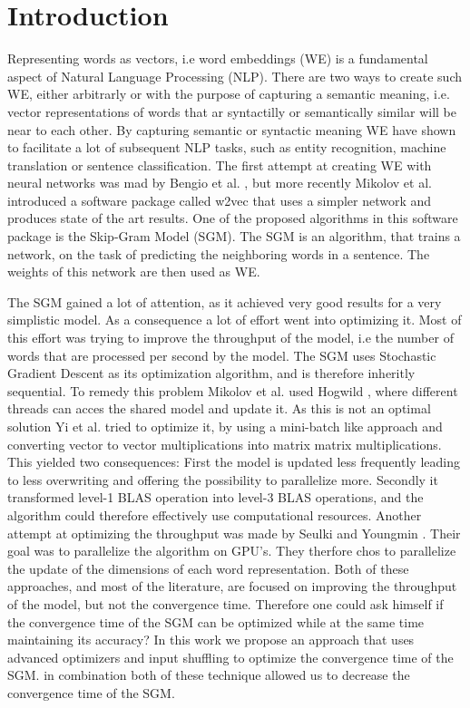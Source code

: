 \chapter{Introduction}\label{chap:introduction}

Representing words as vectors, i.e word embeddings (WE) is a fundamental aspect of Natural Language Processing (NLP). There are two ways to create such WE, either arbitrarly or with the purpose of capturing a semantic meaning, i.e. vector representations of words that ar syntactilly or semantically similar will be near to each other. By capturing semantic or syntactic meaning WE have shown to facilitate a lot of subsequent NLP tasks, such as entity recognition, machine translation or sentence classification.  The first attempt at creating WE with neural networks was mad by Bengio et al. \cite{bengio}, but more recently Mikolov et al. \cite{mikolov} introduced a software package called w2vec that uses a simpler network and produces state of the art results. One of the proposed algorithms in this software package is the Skip-Gram Model (SGM). The SGM is an algorithm, that trains a network, on the task of predicting the neighboring words in a sentence. The weights of this network are then used as WE. 

The SGM gained a lot of attention, as it achieved very good results for a very simplistic model. As a consequence a lot of effort went into optimizing  it. Most of this effort was trying to improve the throughput of the model, i.e the number of words that are processed per second by the model. The SGM uses Stochastic Gradient Descent as its optimization algorithm, and is therefore inheritly sequential. To remedy this problem Mikolov et al. used Hogwild \cite{hogwild}, where different threads can acces the shared model and update it. As this is not an optimal solution Yi et al. \cite{intel} tried to optimize it, by using a mini-batch like approach and converting vector to vector multiplications into matrix matrix multiplications. This yielded two consequences: First the model is updated less frequently leading to less overwriting and offering the possibility to parallelize more. Secondly it transformed level-1 BLAS operation into level-3 BLAS operations, and the algorithm could therefore effectively use computational resources. Another attempt at optimizing the throughput was made by Seulki and Youngmin \cite{gpu}. Their goal was to parallelize the algorithm on GPU's. They therfore chos to parallelize the update of the dimensions of each word representation. Both of these approaches, and most of the literature, are focused on improving the throughput of the model, but not the convergence time.  Therefore one could ask himself if the convergence time of the SGM can be optimized while at the same time maintaining its accuracy? In this work we propose an approach that uses advanced optimizers and input shuffling to optimize the convergence time of the SGM. in combination both of these technique allowed us to decrease the convergence time of the SGM.

